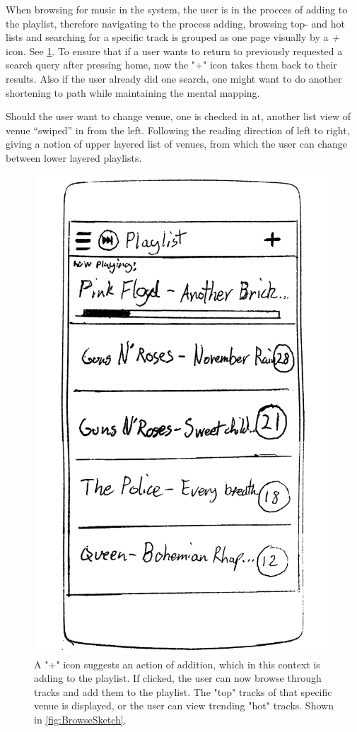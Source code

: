 When browsing for music in the system, the user is in the procces of
adding to the playlist, therefore navigating to the process adding,
browsing top- and hot lists and searching for a specific track is
grouped as one page visually by a \emph{+} icon. See
\cref{fig:PlaylistSketch}. To ensure that if a user wants to return to
previously requested a search query after pressing home, now the "+"
icon takes them back to their results. Also if the user already did
one search, one might want to do another shortening to path while
maintaining the mental mapping. 

Should the user want to change venue, one is checked in at, another list view of venue \enquote{swiped} in from the left. Following the reading direction of left to right, giving a notion of upper layered list of venues, from which the user can change between lower layered playlists.


\begin{figure}[hbtp]
  \centering
  \includegraphics[width=0.3\linewidth]{Images/sketch3.png}
  \caption[Playlist view sketch.]{A "+" icon suggests an action of addition, which in this context is adding to the playlist. If clicked, the user can now browse through tracks and add them to the playlist. The "top" tracks of that specific venue is displayed, or the user can view trending "hot" tracks. Shown in \cref{fig:BrowseSketch}.}
  \label{fig:PlaylistSketch}
\end{figure}


